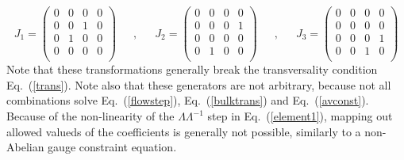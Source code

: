 \documentclass[12pt,onecolumn,showpacs,amssymb,aps,nofootinbib,floatfix]{revtex4-2}
\renewcommand{\eqref}[1]{Eq.~(\ref{#1})}
\newcommand{\eqcomma}{\phantom{AA},\phantom{AA}}
\begin{document}
	\begin{equation}
		\label{jproj}
		J_1 = \left(
		\begin{array}{cccc}
			0 & 0 & 0 & 0\\
			0 & 0 & 1 & 0\\
			0 & 1 & 0 & 0\\
			0 & 0 & 0 & 0\\
		\end{array}
		\right) \eqcomma J_2=  \left(
		\begin{array}{cccc}
			0 & 0 & 0 & 0\\
			0 & 0 & 0 & 1\\
			0 & 0 & 0 & 0\\
			0 & 1 & 0 & 0\\
		\end{array}
		\right) \eqcomma J_3=  \left(
		\begin{array}{cccc}
			0 & 0 & 0 & 0\\
			0 & 0 & 0 & 0\\
			0 & 0 & 0 & 1\\
			0 & 0 & 1 & 0\\
		\end{array}
		\right)  \end{equation}
        Note that these transformations generally break the transversality condition \eqref{trans}.
        Note also that these generators are not arbitrary, because not all combinations solve \eqref{flowstep}, \eqref{bulktrans} and \eqref{avconst}.
Because of the non-linearity of the $\Lambda \Lambda^{-1}$ step in \eqref{element1}, mapping out allowed valueds of the coefficients is generally not possible, similarly to a non-Abelian gauge constraint equation.\color{black}
               
\end{document}
